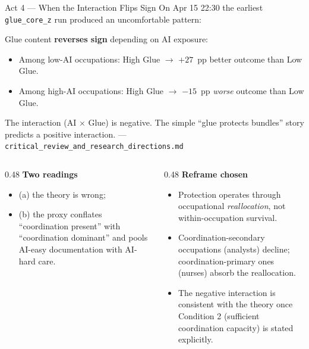 \documentclass[10pt,english,aspectratio=169]{beamer}
\begin{document}
\begin{frame}{Act 4 --- When the Interaction Flips Sign}
On Apr 15 22:30 the earliest \texttt{glue\_core\_z} run produced an uncomfortable pattern:

\vspace{0.1cm}
\begin{tcolorbox}[colback=gray!5,colframe=gray!40]
\footnotesize
Glue content \textbf{reverses sign} depending on AI exposure:
\begin{itemize}\footnotesize
  \item Among low-AI occupations: High Glue $\to$ $+27$~pp better outcome than Low Glue.
  \item Among high-AI occupations: High Glue $\to$ $-15$~pp \emph{worse} outcome than Low Glue.
\end{itemize}
The interaction (AI $\times$ Glue) is negative. The simple ``glue protects bundles'' story predicts a positive interaction. --- \texttt{critical\_review\_and\_research\_directions.md}
\end{tcolorbox}

\vspace{0.15cm}
\begin{columns}[T]
\begin{column}{0.48\textwidth}
\textbf{Two readings}
\begin{itemize}\scriptsize
  \item (a) the theory is wrong;
  \item (b) the proxy conflates ``coordination present'' with ``coordination dominant'' and pools AI-easy documentation with AI-hard care.
\end{itemize}
\end{column}
\begin{column}{0.48\textwidth}
\textbf{Reframe chosen}
\begin{itemize}\scriptsize
  \item Protection operates through occupational \emph{reallocation}, not within-occupation survival.
  \item Coordination-secondary occupations (analysts) decline; coordination-primary ones (nurses) absorb the reallocation.
  \item The negative interaction is consistent with the theory once Condition 2 (sufficient coordination capacity) is stated explicitly.
\end{itemize}
\end{column}
\end{columns}
\end{frame}
\end{document}
